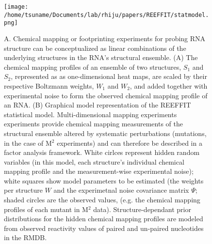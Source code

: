 \documentclass[12pt]{article}
\begin{document}
\begin{figure}[here]
\texttt{[image: /home/tsuname/Documents/lab/rhiju/papers/REEFFIT/statmodel.png]}
\caption{A. Chemical mapping or footprinting experiments for probing RNA structure can be conceptualized as linear combinations of the underlying structures in the RNA's structural ensemble. (A) The chemical mapping profiles of an ensemble of two structures, $S_1$ and $S_2$, represented as as one-dimensional heat maps, are scaled by their respective Boltzmann weights, $W_1$ and $W_2$, and added together with experimental noise to form the observed chemical mapping profile of an RNA. (B) Graphical model representation of the REEFFIT statistical model. Multi-dimensional mapping experiments experiments provide chemical mapping measurements of the structural ensemble altered by systematic perturbations (mutations, in the case of M$^2$ experiments) and can therefore be described in a factor analysis framework. White cirlces represent hidden random variables (in this model, each structure's individual chemical mapping profile and the measurement-wise experimental noise); white squares show model parameters to be estimated (the weights per structure $W$ and the experimetnal noise covariance matrix $\Psi$; shaded circles are the observed values, (e.g. the chemical mapping profiles of each mutant in M$^2$ data). Structure-dependant prior distributions for the hidden chemical mapping profiles are modeled from observed reactivity values of paired and un-paired nucleotides in the RMDB.}
\label{fig:statmodelfig}
\end{figure}

\end{document}
